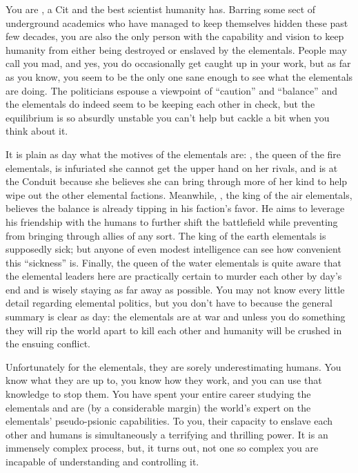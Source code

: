 \documentclass[char]{elementals}
\begin{document}
\name{\cMS{}}

You are \cMS{\intro}, a Cit and the best scientist humanity has. Barring some sect of underground academics who have managed to keep themselves hidden these past few decades, you are also the only person with the capability and vision to keep humanity from either being destroyed or enslaved by the elementals. People may call you mad, and yes, you do occasionally get caught up in your work, but as far as you know, you seem to be the only one sane enough to see what the elementals are doing. The politicians espouse a viewpoint of ``caution'' and ``balance'' and the elementals do indeed seem to be keeping each other in check, but the equilibrium is so absurdly unstable you can't help but cackle a bit when you think about it.

It is plain as day what the motives of the elementals are: \cQueen{\intro}, the queen of the fire elementals, is infuriated she cannot get the upper hand on her rivals, and is at the Conduit because she believes she can bring through more of her kind to help wipe out the other elemental factions. Meanwhile, \cKing{\intro}, the king of the air elementals, believes the balance is already tipping in his faction's favor. He aims to leverage his friendship with the humans to further shift the battlefield while preventing \cQueen{} from bringing through allies of any sort. The king of the earth elementals is supposedly sick; but anyone of even modest intelligence can see how convenient this ``sickness'' is. Finally, the queen of the water elementals is quite aware that the elemental leaders here are practically certain to murder each other by day's end and is wisely staying as far away as possible. You may not know every little detail regarding elemental politics, but you don't have to because the general summary is clear as day: the elementals are at war and unless you do something they will rip the world apart to kill each other and humanity will be crushed in the ensuing conflict.

Unfortunately for the elementals, they are sorely underestimating humans. You know what they are up to, you know how they work, and you can use that knowledge to stop them. You have spent your entire career studying the elementals and are (by a considerable margin) the world's expert on the elementals' pseudo-psionic capabilities. To you, their capacity to enslave each other and humans is simultaneously a terrifying and thrilling power. It is an immensely complex process, but, it turns out, not one so complex you are incapable of understanding and controlling it. 
\end{document}
